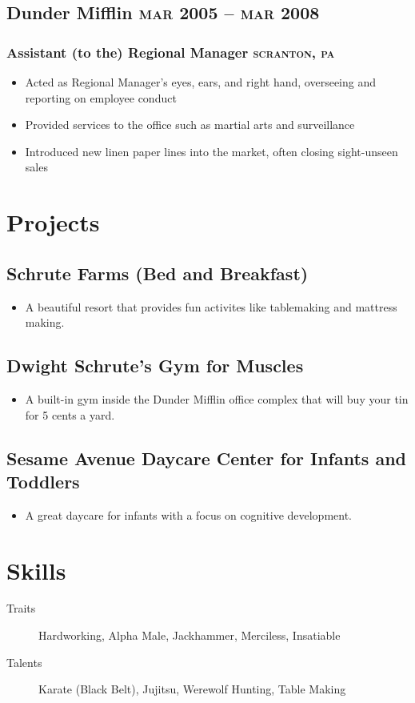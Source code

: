 \documentclass{article}
\newcommand{\rside}[1]{\hfill \normalfont\scshape\MakeLowercase{#1}}
\begin{document}
\subsection{Dunder Mifflin \rside{Mar 2005 -- Mar 2008}}
\subsubsection{Assistant (to the) Regional Manager \rside{Scranton, PA}}
\begin{itemize}
  \item Acted as Regional Manager's eyes, ears, and right hand, overseeing and reporting on employee conduct
  \item Provided services to the office such as martial arts and surveillance
  \item Introduced new linen paper lines into the market, often closing sight-unseen sales
\end{itemize}


\section{\faFlask\enspace Projects}

\subsection{Schrute Farms (Bed and Breakfast)}
\begin{itemize}
  \item A beautiful resort that provides fun activites like tablemaking and mattress making.
\end{itemize}

\subsection{Dwight Schrute’s Gym for Muscles}
\begin{itemize}
  \item A built-in gym inside the Dunder Mifflin office complex that will buy your tin for 5 cents a yard.
\end{itemize}

\subsection{Sesame Avenue Daycare Center for Infants and Toddlers}
\begin{itemize}
  \item A great daycare for infants with a focus on cognitive development.
\end{itemize}


\section{\faCogs\enspace Skills}
\begin{description}
  \item[Traits] Hardworking, Alpha Male, Jackhammer, Merciless, Insatiable
  \item[Talents] Karate (Black Belt), Jujitsu, Werewolf Hunting, Table Making 
\end{description}
\end{document}
